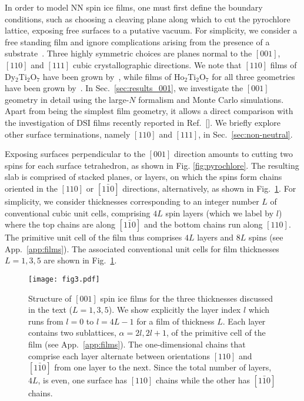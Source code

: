 \documentclass[aps,prx,reprint,runinaddress,superscriptaddress,amsmath,amssymb,floatfix,longbibliography]{revtex4-1}
\begin{document}
In order to model \ac{NN} spin ice films, one must first define the
boundary conditions, such as choosing a cleaving plane along which to cut the pyrochlore lattice,  exposing free surfaces to a putative vacuum. For simplicity, we consider a free standing film and ignore complications arising from the presence of a substrate~\cite{Bovo2014,Leusink2014}. Three highly symmetric choices are planes normal to the $[001]$, $[110]$ and $[111]$ cubic crystallographic directions. We note that $[110]$ films of Dy$_2$Ti$_2$O$_7$ have been grown by~\citet{Bovo2014}, while films of Ho$_2$Ti$_2$O$_7$ for all three geometries have been grown by~\citet{Leusink2014}. In Sec.~\ref{sec:results_001}, we investigate the $[001]$ geometry in detail using the large-$N$ formalism and Monte Carlo simulations. Apart from being the simplest film geometry, it allows a direct comparison with the investigation of \ac{DSI} films recently reported in Ref.~[]. We briefly explore other surface terminations, namely $[110]$ and $[111]$, in Sec.~\ref{sec:non-neutral}.

Exposing surfaces perpendicular to the $[001]$ direction amounts to cutting two spins for each surface tetrahedron, as shown in Fig. \ref{fig:pyrochlore}. The resulting slab is comprised of stacked planes, or layers, on which the spins form chains oriented in the $[110]$ or $[1\bar{1}0]$ directions, alternatively, as shown in  Fig.~\ref{fig:stacking}. For simplicity, we consider thicknesses corresponding to an integer number $L$ of conventional cubic unit cells, comprising $4L$ spin layers (which we label by $l$) where the top chains are along $[1\bar{1}0]$ and the bottom chains run along $[110]$. The primitive unit cell of the film thus comprises $4L$ layers and $8L$ spins (see App.~\ref{app:films}). The associated conventional unit cells for film thicknesses $L=1,3,5$ are shown in Fig.~\ref{fig:stacking}.
%
\begin{figure}
	\centering
        \texttt{[image: fig3.pdf]}
	\caption{Structure of $[001]$ spin ice films for the three thicknesses discussed in the text ($L=1,3,5$). We show explicitly the layer index $l$ which runs from $l = 0$ to $l = 4L-1$ for a film of thickness $L$. Each layer contains two sublattices,  $\alpha = 2l,2l+1$, of the primitive cell of the film (see App.~\ref{app:films}). The one-dimensional chains that comprise each layer alternate between orientations $[110]$ and $[1\bar{1}0]$ from one layer to the next. Since the total number of layers, $4L$, is even, one surface has $[110]$ chains while the other has $[1\bar{1}0]$ chains.
	\label{fig:stacking}}
\end{figure}
\end{document}
